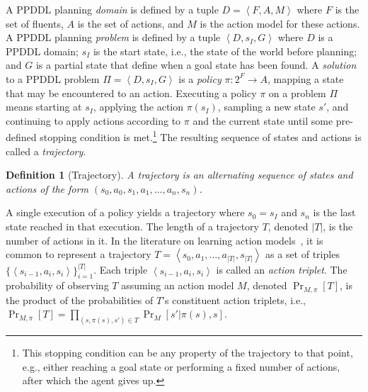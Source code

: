\documentclass[letterpaper]{article} %
\newtheorem{definition}{Definition}
\newcommand{\tuple}[1]{\ensuremath{\left \langle #1 \right \rangle }}
\begin{document}
A PPDDL planning \emph{domain} is defined by a tuple 
$D=\tuple{F, A, M}$
where $F$ is the set of fluents, 
$A$ is the set of actions,
and $M$ is the action model for these actions.  
A PPDDL planning \emph{problem} is defined by a tuple 
$\tuple{D, s_I, G}$ where $D$ is a PPDDL domain;
$s_I$ is the start state, i.e., the state of the world before planning;  
and $G$ is a partial state that define when a goal state has been found. 
A \emph{solution} to a PPDDL problem $\Pi=\tuple{D, s_I, G}$ is a \emph{policy} $\pi:2^F\rightarrow A$,  
mapping a state that may be encountered to an action. 
Executing a policy $\pi$ on a problem $\Pi$ means starting at $s_I$, applying the action $\pi(s_I)$, 
sampling a new state $s'$, and continuing to apply actions according to $\pi$ and the current state until some pre-defined stopping condition is met.\footnote{This stopping condition can be any property of the trajectory to that point, e.g., either reaching a goal state or performing a fixed number of actions, after which the agent gives up.} 
The resulting sequence of states and actions is called a \emph{trajectory}. 

\begin{definition}[Trajectory]
A trajectory is an alternating sequence of states and actions of the form $(s_0, a_0, s_1, a_1,\ldots, a_n, s_n)$. 
\end{definition}
A single execution of a policy yields a trajectory where $s_0=s_I$ and $s_n$ is the last state reached in that execution. 
The length of a trajectory $T$, denoted $|T|$, is the number of actions in it.  
In the literature on learning action models~\cite[among others]{wang1994learning,wang1995learning,walsh2008efficient,stern2017efficientAndSafe,arora2018review}, 
it is common to represent a trajectory $T=\tuple{s_0, a_1, \ldots, a_{|T|}, s_{|T|}}$
as a set of triples 
$\big\{\tuple{s_{i-1},a_i,s_i}\big\}_{i=1}^{|T|}$. 
Each triple $\tuple{s_{i-1},a_i,s_i}$ is called an \emph{action triplet}. 
The probability of observing $T$ assuming an action model $M$, denoted $\Pr_{M,\pi}[T]$, is the product of the probabilities of $T$'s constituent action triplets, i.e., $\Pr_{M,\pi}[T]=\prod_{(s,\pi(s),s')\in T} \Pr_M[s'|\pi(s),s]$. 
\end{document}
